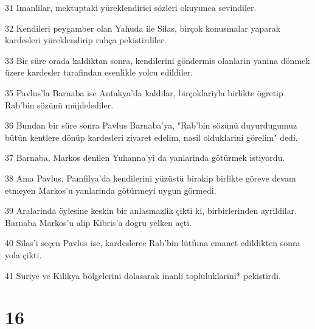 \par 31 Imanlilar, mektuptaki yüreklendirici sözleri okuyunca sevindiler.
\par 32 Kendileri peygamber olan Yahuda ile Silas, birçok konusmalar yaparak kardesleri yüreklendirip ruhça pekistirdiler.
\par 33 Bir süre orada kaldiktan sonra, kendilerini göndermis olanlarin yanina dönmek üzere kardesler tarafindan esenlikle yolcu edildiler.
\par 35 Pavlus'la Barnaba ise Antakya'da kaldilar, birçoklariyla birlikte ögretip Rab'bin sözünü müjdelediler.
\par 36 Bundan bir süre sonra Pavlus Barnaba'ya, "Rab'bin sözünü duyurdugumuz bütün kentlere dönüp kardesleri ziyaret edelim, nasil olduklarini görelim" dedi.
\par 37 Barnaba, Markos denilen Yuhanna'yi da yanlarinda götürmek istiyordu.
\par 38 Ama Pavlus, Pamfilya'da kendilerini yüzüstü birakip birlikte göreve devam etmeyen Markos'u yanlarinda götürmeyi uygun görmedi.
\par 39 Aralarinda öylesine keskin bir anlasmazlik çikti ki, birbirlerinden ayrildilar. Barnaba Markos'u alip Kibris'a dogru yelken açti.
\par 40 Silas'i seçen Pavlus ise, kardeslerce Rab'bin lütfuna emanet edildikten sonra yola çikti.
\par 41 Suriye ve Kilikya bölgelerini dolasarak inanli topluluklarini* pekistirdi.

\chapter{16}

